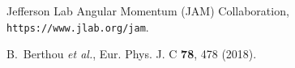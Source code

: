 \documentclass{article}[12pt,preprint]
\begin{document}
\begin{thebibliography}{99}

Jefferson Lab Angular Momentum (JAM) Collaboration,
{\tt https://www.jlab.org/jam}.

B.~Berthou {\it et al.},
Eur. Phys. J. C {\bf 78}, 478 (2018).

\end{thebibliography}
\end{document}

